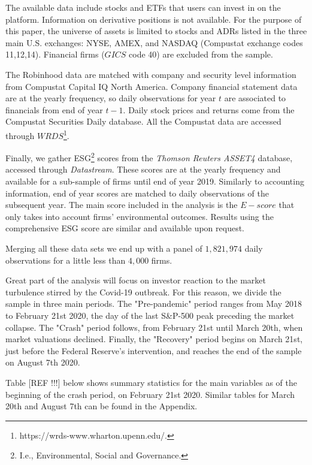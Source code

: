 \documentclass[12pt]{article}
\numberwithin{equation}{section} %
\begin{document}
The available data include stocks and ETFs that users can invest in on the platform. Information on derivative positions is not available. For the purpose of this paper, the universe of assets is limited to stocks and ADRs listed in the three main U.S. exchanges: NYSE, AMEX, and NASDAQ (Compustat exchange codes 11,12,14). Financial firms ($GICS$ code 40) are excluded from the sample.

The Robinhood data are matched with company and security level information from Compustat Capital IQ North America. Company financial statement data are at the yearly frequency, so daily observations for year $t$ are associated to financials from end of year $t-1$. Daily stock prices and returns come from the Compustat Securities Daily database. All the Compustat data are accessed through $WRDS$\footnote{https://wrds-www.wharton.upenn.edu/.}.

Finally, we gather ESG\footnote{I.e., Environmental, Social and Governance.} scores from the \textit{Thomson Reuters ASSET4} database, accessed through \textit{Datastream}. These scores are at the yearly frequency and available for a sub-sample of firms until end of year 2019. Similarly to accounting information, end of year scores are matched to daily observations of the subsequent year. The main score included in the analysis is the $E-score$ that only takes into account firms' environmental outcomes. Results using the comprehensive ESG score are similar and available upon request.  

Merging all these data sets we end up with a panel of $1,821,974$ daily observations for a little less than $4,000$ firms.

Great part of the analysis will focus on investor reaction to the market turbulence stirred by the Covid-19 outbreak. For this reason, we divide the sample in three main periods. The "Pre-pandemic" period ranges from May 2018 to February 21st 2020, the day of the last S\&P-500 peak preceding the market collapse. The "Crash" period follows, from February 21st until March 20th, when market valuations declined. Finally, the "Recovery" period begins on March 21st, just before the Federal Reserve's intervention, and reaches the end of the sample on August 7th 2020.

Table [REF !!!] below shows summary statistics for the main variables as of the beginning of the crash period, on February 21st 2020. Similar tables for March 20th and August 7th can be found in the Appendix.

 
\end{document}
